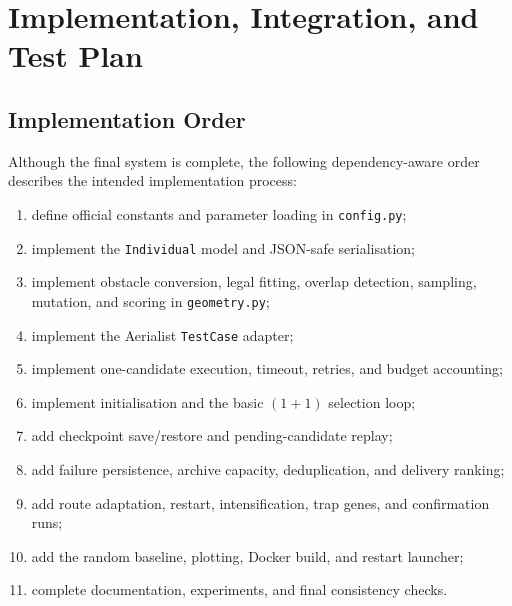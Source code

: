 \documentclass[11pt,a4paper,openany]{report}
\newcommand{\code}[1]{\texttt{#1}}
\begin{document}
\chapter{Implementation, Integration, and Test Plan}

\section{Implementation Order}
Although the final system is complete, the following dependency-aware order describes the intended implementation process:
\begin{enumerate}
  \item define official constants and parameter loading in \code{config.py};
  \item implement the \code{Individual} model and JSON-safe serialisation;
  \item implement obstacle conversion, legal fitting, overlap detection, sampling, mutation, and scoring in \code{geometry.py};
  \item implement the Aerialist \code{TestCase} adapter;
  \item implement one-candidate execution, timeout, retries, and budget accounting;
  \item implement initialisation and the basic $(1+1)$ selection loop;
  \item add checkpoint save/restore and pending-candidate replay;
  \item add failure persistence, archive capacity, deduplication, and delivery ranking;
  \item add route adaptation, restart, intensification, trap genes, and confirmation runs;
  \item add the random baseline, plotting, Docker build, and restart launcher;
  \item complete documentation, experiments, and final consistency checks.
\end{enumerate}
\end{document}
